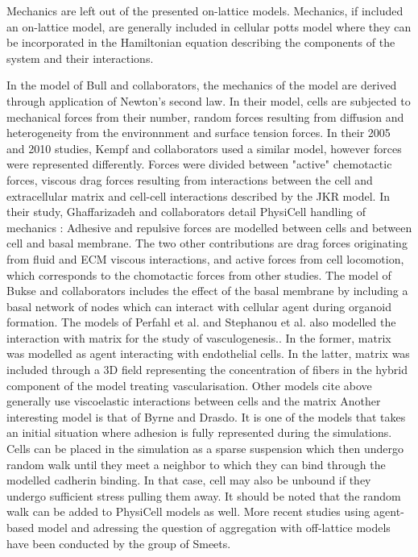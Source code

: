 \documentclass[11pt,a4paper]{article}
\begin{document}
Mechanics are left out of the presented on-lattice models. Mechanics, if included an on-lattice model, are generally included in cellular potts model where they can be incorporated in the Hamiltonian equation describing the components of the system and their interactions.\cite{Osborne2017}\cite{Shirinifard2009}

In the model of Bull and collaborators, the mechanics of the model are derived through application of Newton's second law. In their model, cells are subjected to mechanical forces from their number, random forces resulting from diffusion and heterogeneity from the environnment and surface tension forces.\cite{Bull2020} In their 2005 and 2010 studies, Kempf and collaborators used a similar model, however forces were represented differently. Forces were divided between "active" chemotactic forces, viscous drag forces resulting from interactions between the cell and extracellular matrix and cell-cell interactions described by the JKR model.\cite{Kempf2005}\cite{Kempf2010} In their study, Ghaffarizadeh and collaborators detail PhysiCell handling of mechanics : Adhesive and repulsive forces are modelled between cells and between cell and basal membrane. The two other contributions are drag forces originating from fluid and ECM viscous interactions, and active forces from cell locomotion, which corresponds to the chomotactic forces from other studies.\cite{Ghaffarizadeh2017} The model of Bukse and collaborators includes the effect of the basal membrane by including a basal network of nodes which can interact with cellular agent during organoid formation. The models of Perfahl et al. and Stephanou et al. also modelled the interaction with matrix for the study of vasculogenesis.\cite{Perfahl2016}\cite{Stephanou2017}. In the former, matrix was modelled as agent interacting with endothelial cells. In the latter, matrix was included through a 3D field representing the concentration of fibers in the hybrid component of the model treating vascularisation. Other models cite above generally use viscoelastic interactions between  cells and the matrix  Another interesting model is that of Byrne and Drasdo.\cite{Byrne2008} It is one of the models that takes an initial situation where adhesion is fully represented during the simulations. Cells can be placed in the simulation as a sparse suspension which then undergo random walk until they meet a neighbor to which they can bind through the modelled cadherin binding. In that case, cell may also be unbound if they undergo sufficient stress pulling them away. It should be noted that the random walk can be added to PhysiCell models as well. More recent studies using agent-based model and adressing the question of aggregation with off-lattice models have been conducted by the group of Smeets.\cite{Smeets2020}\cite{Ongenae2021}
 
\end{document}
